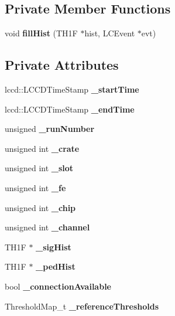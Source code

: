 \subsection*{Private Member Functions}
\begin{DoxyCompactItemize}
\item 
void {\bfseries fill\-Hist} (T\-H1\-F $\ast$hist, L\-C\-Event $\ast$evt)\label{classCALICE_1_1multiCalibrator_a0f54d7d5a1e9b4469bc59ae7b2d3a204}

\end{DoxyCompactItemize}
\subsection*{Private Attributes}
\begin{DoxyCompactItemize}
\item 
lccd\-::\-L\-C\-C\-D\-Time\-Stamp {\bfseries \-\_\-start\-Time}\label{classCALICE_1_1multiCalibrator_a33b407cfd46e3ac56bdc30947e0eb2e1}

\item 
lccd\-::\-L\-C\-C\-D\-Time\-Stamp {\bfseries \-\_\-end\-Time}\label{classCALICE_1_1multiCalibrator_a06d7b62ae49be9bad5c7eb8a7f270f58}

\item 
unsigned {\bfseries \-\_\-run\-Number}\label{classCALICE_1_1multiCalibrator_acfcabcaf4253473ac3d99df1f162da5f}

\item 
unsigned int {\bfseries \-\_\-crate}\label{classCALICE_1_1multiCalibrator_afc05f707dab2f811d755300d480d57f6}

\item 
unsigned int {\bfseries \-\_\-slot}\label{classCALICE_1_1multiCalibrator_a88106b2a17b0308851dfdace4d9fd8a4}

\item 
unsigned int {\bfseries \-\_\-fe}\label{classCALICE_1_1multiCalibrator_a7e31fc8c645ee72b61deafacb51ee6b5}

\item 
unsigned int {\bfseries \-\_\-chip}\label{classCALICE_1_1multiCalibrator_ae8423d1b22561196f45134990b6e3be5}

\item 
unsigned int {\bfseries \-\_\-channel}\label{classCALICE_1_1multiCalibrator_a1a14cc1103c22d000ea6565619bc98ee}

\item 
T\-H1\-F $\ast$ {\bfseries \-\_\-sig\-Hist}\label{classCALICE_1_1multiCalibrator_a5087ce6fdd939090347791bc86a02025}

\item 
T\-H1\-F $\ast$ {\bfseries \-\_\-ped\-Hist}\label{classCALICE_1_1multiCalibrator_abf5102e26fbe03d997813b06eea13818}

\item 
bool {\bfseries \-\_\-connection\-Available}\label{classCALICE_1_1multiCalibrator_adcb7ef44a6a00a92da355ee43dbcc147}

\item 
Threshold\-Map\-\_\-t {\bfseries \-\_\-reference\-Thresholds}\label{classCALICE_1_1multiCalibrator_ac2eccfcf6a4b10389fabf83c743a9b0d}

\end{DoxyCompactItemize}



